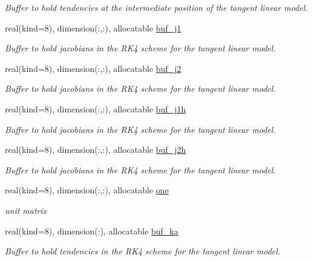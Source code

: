\begin{DoxyCompactItemize}
\begin{DoxyCompactList}\small\item\em Buffer to hold tendencies at the intermediate position of the tangent linear model. \end{DoxyCompactList}\item 
real(kind=8), dimension(\+:,\+:), allocatable \hyperlink{namespacetl__ad__integrator_abf7d3c46036ca20cca151adc20a2fa14}{buf\+\_\+j1}
\begin{DoxyCompactList}\small\item\em Buffer to hold jacobians in the R\+K4 scheme for the tangent linear model. \end{DoxyCompactList}\item 
real(kind=8), dimension(\+:,\+:), allocatable \hyperlink{namespacetl__ad__integrator_a0ce53a275fcb35f76e2b34ee8d8df1ca}{buf\+\_\+j2}
\begin{DoxyCompactList}\small\item\em Buffer to hold jacobians in the R\+K4 scheme for the tangent linear model. \end{DoxyCompactList}\item 
real(kind=8), dimension(\+:,\+:), allocatable \hyperlink{namespacetl__ad__integrator_a4ae89c821542838ecfc5ac3b7a76d5c1}{buf\+\_\+j1h}
\begin{DoxyCompactList}\small\item\em Buffer to hold jacobians in the R\+K4 scheme for the tangent linear model. \end{DoxyCompactList}\item 
real(kind=8), dimension(\+:,\+:), allocatable \hyperlink{namespacetl__ad__integrator_a2a5e4cbc6f573f1274e53cbb4607f5bb}{buf\+\_\+j2h}
\begin{DoxyCompactList}\small\item\em Buffer to hold jacobians in the R\+K4 scheme for the tangent linear model. \end{DoxyCompactList}\item 
real(kind=8), dimension(\+:,\+:), allocatable \hyperlink{namespacetl__ad__integrator_a08f375467a942d0ad466b407a8007a7e}{one}
\begin{DoxyCompactList}\small\item\em unit matrix \end{DoxyCompactList}\item 
real(kind=8), dimension(\+:), allocatable \hyperlink{namespacetl__ad__integrator_a879cc86c1e268775237b6776a4ff7d32}{buf\+\_\+ka}
\begin{DoxyCompactList}\small\item\em Buffer to hold tendencies in the R\+K4 scheme for the tangent linear model. \end{DoxyCompactList}\item 

\end{DoxyCompactItemize}
